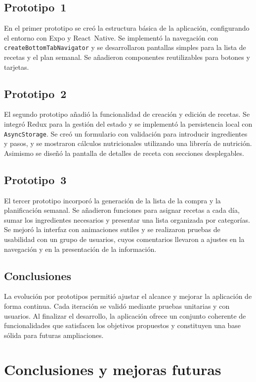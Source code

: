 \documentclass[twoside, openright, 11pt]{report}
\begin{document}
\section{Prototipo 1}
En el primer prototipo se creó la estructura básica de la aplicación, configurando el entorno con Expo y React Native. Se implementó la navegación con \verb|createBottomTabNavigator| y se desarrollaron pantallas simples para la lista de recetas y el plan semanal. Se añadieron componentes reutilizables para botones y tarjetas.

\section{Prototipo 2}
El segundo prototipo añadió la funcionalidad de creación y edición de recetas. Se integró Redux para la gestión del estado y se implementó la persistencia local con \verb|AsyncStorage|. Se creó un formulario con validación para introducir ingredientes y pasos, y se mostraron cálculos nutricionales utilizando una librería de nutrición. Asimismo se diseñó la pantalla de detalles de receta con secciones desplegables.

\section{Prototipo 3}
El tercer prototipo incorporó la generación de la lista de la compra y la planificación semanal. Se añadieron funciones para asignar recetas a cada día, sumar los ingredientes necesarios y presentar una lista organizada por categorías. Se mejoró la interfaz con animaciones sutiles y se realizaron pruebas de usabilidad con un grupo de usuarios, cuyos comentarios llevaron a ajustes en la navegación y en la presentación de la información.

\section{Conclusiones}
La evolución por prototipos permitió ajustar el alcance y mejorar la aplicación de forma continua. Cada iteración se validó mediante pruebas unitarias y con usuarios. Al finalizar el desarrollo, la aplicación ofrece un conjunto coherente de funcionalidades que satisfacen los objetivos propuestos y constituyen una base sólida para futuras ampliaciones.

\chapter{Conclusiones y mejoras futuras}\label{cap.conclusiones y mejoras futuras}
\end{document}
